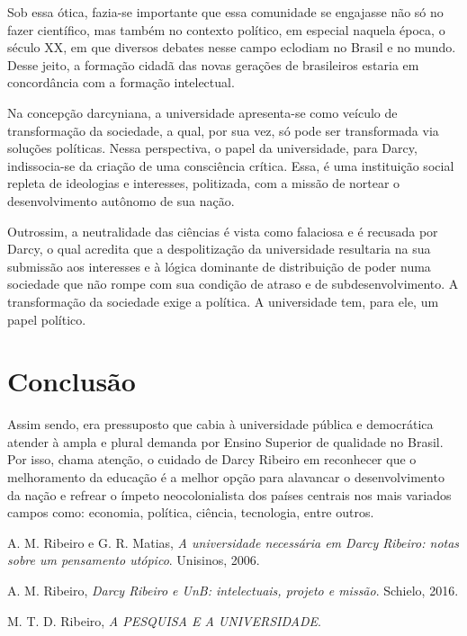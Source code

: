 \documentclass{sbrt}
\begin{document}
Sob essa ótica, fazia-se importante que essa comunidade se engajasse não só no fazer científico, mas também no contexto político, em especial naquela época, o século XX, em que diversos debates nesse campo eclodiam no Brasil e no mundo. Desse jeito, a formação cidadã das novas gerações de brasileiros estaria em concordância com a formação intelectual.

Na concepção darcyniana, a universidade apresenta-se como veículo de transformação da sociedade, a qual, por sua vez, só pode ser transformada via soluções políticas. Nessa perspectiva, o papel da universidade, para Darcy, indissocia-se da criação de uma consciência crítica. Essa, é uma instituição social repleta de ideologias e interesses, politizada, com a missão de nortear o desenvolvimento autônomo de sua nação.

Outrossim, a neutralidade das ciências é vista como falaciosa e é recusada por Darcy, o qual acredita que a despolitização da universidade resultaria na sua submissão aos interesses e à lógica dominante de distribuição de poder numa sociedade que não rompe com sua condição de atraso e de subdesenvolvimento. A transformação da sociedade exige a política. A universidade tem, para ele, um papel político.

\section{Conclusão}

Assim sendo, era pressuposto que cabia à universidade pública e democrática atender à ampla e plural demanda por Ensino Superior de qualidade no Brasil. Por isso, chama atenção, o cuidado de Darcy Ribeiro em reconhecer que o melhoramento da educação é a melhor opção para alavancar o desenvolvimento da nação e refrear o ímpeto neocolonialista dos países centrais nos mais variados campos como: economia, política, ciência, tecnologia, entre outros.

\begin{thebibliography}{99}
 A. M. Ribeiro e G. R. Matias, \textit{A universidade necessária em Darcy Ribeiro: notas sobre  um pensamento utópico}. Unisinos, 2006.

 A. M. Ribeiro, \textit{Darcy Ribeiro e UnB: intelectuais, projeto e missão}. Schielo, 2016.

 M. T. D. Ribeiro, \textit{A PESQUISA E A UNIVERSIDADE}.
\end{thebibliography}
\end{document}
